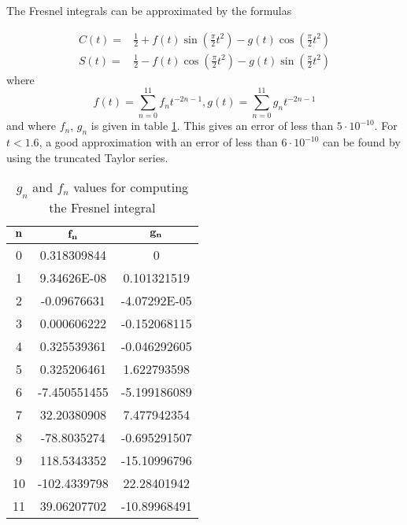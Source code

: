 
The Fresnel integrals can be approximated by the formulas

\begin{align*}
C(t) =& \frac{1}{2} + f(t)\sin\left(\frac{\pi}{2}t^2\right) - g(t)\cos\left(\frac{\pi}{2}t^2\right)\\
S(t) =& \frac{1}{2} - f(t)\cos\left(\frac{\pi}{2}t^2\right) - g(t)\sin\left(\frac{\pi}{2}t^2\right)
\end{align*}
where
$$
f(t) = \sum_{n=0}^{11} f_nt^{-2n-1}, g(t) = \sum_{n=0}^{11} g_nt^{-2n-1}
$$
and where $f_n$, $g_n$ is given in table \ref{tab:fresnel}. This gives an error of less than $5\cdot 10^{-10}$. For $t < 1.6$, a good approximation with an error of less than $6\cdot 10^{-10}$ can be found by using the truncated Taylor series.\cite{fresnel}

\begin{table}[ht]
\centering
\begin{tabular}{ccc}
\hline
$\mathbf{n}$ & $\mathbf{f_n}$ & $\mathbf{g_n}$\\
\hline
0  &  0.318309844  &  0\\
1  &  9.34626E-08  &  0.101321519\\
2  &  -0.09676631  &  -4.07292E-05\\
3  &  0.000606222  &  -0.152068115\\
4  &  0.325539361  &  -0.046292605\\
5  &  0.325206461  &  1.622793598\\
6  &  -7.450551455 &  -5.199186089\\
7  &  32.20380908  &  7.477942354\\
8  &  -78.8035274  &  -0.695291507\\
9  &  118.5343352  &  -15.10996796\\
10 &  -102.4339798 &  22.28401942\\
11 &  39.06207702  &  -10.89968491\\
\hline
\end{tabular}
\caption{$g_n$ and $f_n$ values for computing the Fresnel integral}
\label{tab:fresnel}
\end{table}
